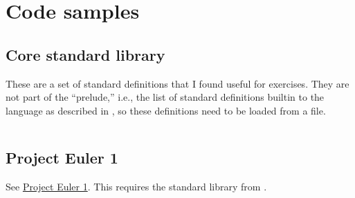 
\section{Code samples}
\label{sec:code-samples}

\subsection{Core standard library}
\label{sec:core-stdlib}

These are a set of standard definitions that I found useful for exercises. They are not part of the ``prelude,'' i.e., the list of standard definitions builtin to the language as described in , so these definitions need to be loaded from a file.

\inputminted[frame=single]{text}{core/stdlib.core}

\subsection{Project Euler 1}
\label{sec:core-pe1}

See \href{https://projecteuler.net/problem=1}{Project Euler 1}. This requires the standard library from .

\inputminted[frame=single]{text}{core/pe1.core}


